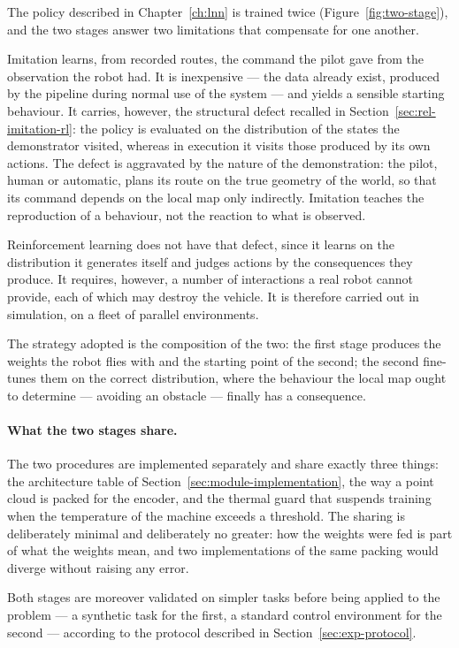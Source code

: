 The policy described in Chapter~\ref{ch:lnn} is trained twice
(Figure~\ref{fig:two-stage}), and the two stages answer two limitations that
compensate for one another.

Imitation learns, from recorded routes, the command the pilot gave from the
observation the robot had. It is inexpensive --- the data already exist,
produced by the pipeline during normal use of the system --- and yields a
sensible starting behaviour. It carries, however, the structural defect recalled
in Section~\ref{sec:rel-imitation-rl}: the policy is evaluated on the
distribution of the states the demonstrator visited, whereas in execution it
visits those produced by its own actions. The defect is aggravated by the nature
of the demonstration: the pilot, human or automatic, plans its route on the true
geometry of the world, so that its command depends on the local map only
indirectly. Imitation teaches the reproduction of a behaviour, not the reaction
to what is observed.

Reinforcement learning does not have that defect, since it learns on the
distribution it generates itself and judges actions by the consequences they
produce. It requires, however, a number of interactions a real robot cannot
provide, each of which may destroy the vehicle. It is therefore carried out in
simulation, on a fleet of parallel environments.

The strategy adopted is the composition of the two: the first stage produces the
weights the robot flies with and the starting point of the second; the second
fine-tunes them on the correct distribution, where the behaviour the local map
ought to determine --- avoiding an obstacle --- finally has a consequence.

\paragraph{What the two stages share.}
The two procedures are implemented separately and share exactly three things:
the architecture table of Section~\ref{sec:module-implementation}, the way a
point cloud is packed for the encoder, and the thermal guard that suspends
training when the temperature of the machine exceeds a threshold. The sharing is
deliberately minimal and deliberately no greater: how the weights were fed is
part of what the weights mean, and two implementations of the same packing would
diverge without raising any error.

Both stages are moreover validated on simpler tasks before being applied to the
problem --- a synthetic task for the first, a standard control environment for
the second --- according to the protocol described in
Section~\ref{sec:exp-protocol}.

